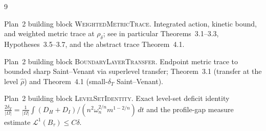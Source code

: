 \documentclass[11pt]{article}
\theoremstyle{definition}
\newcommand{\Om}{\Omega}
\newcommand{\rdel}{\rho_\delta}
\newcommand{\rhad}{\widehat\rho}
\begin{document}
\begin{thebibliography}{9}

Plan~2 building block \textsc{WeightedMetricTrace}.
Integrated action, kinetic bound, and weighted metric trace at
$\rdel$; see in particular Theorems~3.1--3.3, Hypotheses~3.5--3.7, and
the abstract trace Theorem~4.1.

Plan~2 building block \textsc{BoundaryLayerTransfer}.
Endpoint metric trace to bounded sharp Saint--Venant via superlevel
transfer; Theorem~3.1 (transfer at the level $\rhad$) and
Theorem~4.1 (small-$\delta_T$ Saint--Venant).

Plan~2 building block \textsc{LevelSetIdentity}.
Exact level-set deficit identity
$\frac{2\delta_T}{|\Om|}=\frac{1}{|\Om|}\int(D_H+D_I)/(n^2\omega_n^{2/n}m^{1-2/n})\,dt$
and the profile-gap measure estimate
$\mathcal L^1(B_\tau)\le C\delta$.

\end{thebibliography}
\end{document}
